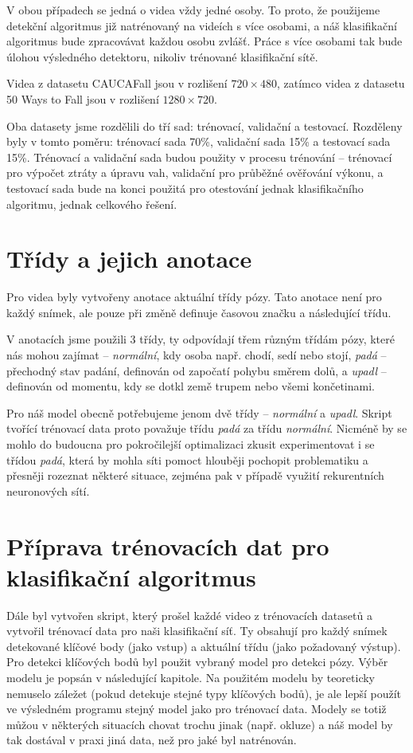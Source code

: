 V obou případech se jedná o videa vždy jedné osoby. To proto, že použijeme
detekční algoritmus již natrénovaný na videích s více osobami, a náš
klasifikační algoritmus bude zpracovávat každou osobu zvlášť. Práce s více
osobami tak bude úlohou výsledného detektoru, nikoliv trénované klasifikační
sítě.

Videa z datasetu CAUCAFall jsou v rozlišení $720\times480$, zatímco videa z
datasetu 50 Ways to Fall jsou v rozlišení $1280\times720$. 

Oba datasety jsme rozdělili do tří sad: trénovací, validační a testovací.
Rozděleny byly v tomto poměru: trénovací sada 70\%, validační sada 15\% a
testovací sada 15\%. Trénovací a validační sada budou použity v procesu
trénování – trénovací pro výpočet ztráty a úpravu vah, validační pro průběžné
ověřování výkonu, a testovací sada bude na konci použitá pro otestování jednak
klasifikačního algoritmu, jednak celkového řešení.

\section{Třídy a jejich anotace}
Pro videa byly vytvořeny anotace aktuální třídy pózy. Tato anotace není pro
každý snímek, ale pouze při změně definuje časovou značku a následující třídu.

V anotacích jsme použili 3 třídy, ty odpovídají třem různým třídám pózy, které
nás mohou zajímat – \textit{normální}, kdy osoba např. chodí, sedí nebo stojí,
\textit{padá} – přechodný stav padání, definován od započatí pohybu směrem
dolů, a \textit{upadl} – definován od momentu, kdy se dotkl země trupem nebo
všemi končetinami.

Pro náš model obecně potřebujeme jenom dvě třídy – \textit{normální} a
\textit{upadl}. Skript tvořící trénovací data proto považuje třídu
\textit{padá} za třídu \textit{normální}. Nicméně by se mohlo do budoucna pro
pokročilejší optimalizaci zkusit experimentovat i se třídou \textit{padá},
která by mohla síti pomoct hlouběji pochopit problematiku a přesněji rozeznat
některé situace, zejména pak v případě využití rekurentních neuronových sítí.

\section{Příprava trénovacích dat pro klasifikační algoritmus}

Dále byl vytvořen skript, který prošel každé video z trénovacích datasetů a
vytvořil trénovací data pro naši klasifikační síť. Ty obsahují pro každý snímek
detekované klíčové body (jako vstup) a aktuální třídu (jako požadovaný výstup).
Pro detekci klíčových bodů byl použit vybraný model pro detekci pózy. Výběr
modelu je popsán v následující kapitole. Na použitém modelu by teoreticky
nemuselo záležet (pokud detekuje stejné typy klíčových bodů), je ale lepší
použít ve výsledném programu stejný model jako pro trénovací data. Modely se
totiž můžou v některých situacích chovat trochu jinak (např. okluze) a náš
model by tak dostával v praxi jiná data, než pro jaké byl natrénován.


